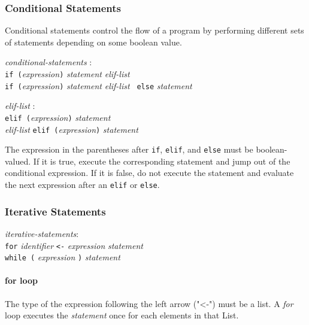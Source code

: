 \documentclass{article}
\begin{document}
\subsubsection{Conditional Statements}
Conditional statements control the flow of a program by performing different sets of statements depending on some boolean value. 

\begin{tabbing}
	\= \emph{cond}\=\emph{itional-statements} : \\
		\>\>  \texttt{if (}\emph{expression}\texttt{)} \emph{statement}\texttt{} \emph{elif-list} \\
		\>\>  \texttt{if (}\emph{expression}\texttt{)} \emph{statement} \texttt{} \emph{elif-list} \texttt{ else} \emph{statement} \\
\end{tabbing}
\begin{tabbing}
	\= \emph{eli}\=\emph{f-list} : \\
		\> \> \texttt{elif (}\emph{expression}\texttt{)} \emph{statement} \\
		\> \> \emph{elif-list} \texttt{elif (}\emph{expression}\texttt{)} \emph{statement}\\
\end{tabbing}

The expression in the parentheses after \texttt{if}, \texttt{elif}, and \texttt{else} must be boolean-valued. If it is true, execute the corresponding statement and jump out of the conditional expression. If it is false, do not execute the statement and evaluate the next expression after an \texttt{elif} or \texttt{else}.

\subsubsection{Iterative Statements}

\begin{tabbing}
	\= \emph{iter}\=\emph{ative-statements}: \\
	\> \> \texttt{for} \emph{identifier} \texttt{<-} \emph{expression} \emph{statement} \\
	\> \> \texttt{while (} \emph{expression} \texttt{)} \emph{statement}
\end{tabbing}

\paragraph{for loop}

The type of the expression following the left arrow ("<-") must be a list. A \emph{for} loop executes the \emph{statement} once for each elements in that List. 
\end{document}
